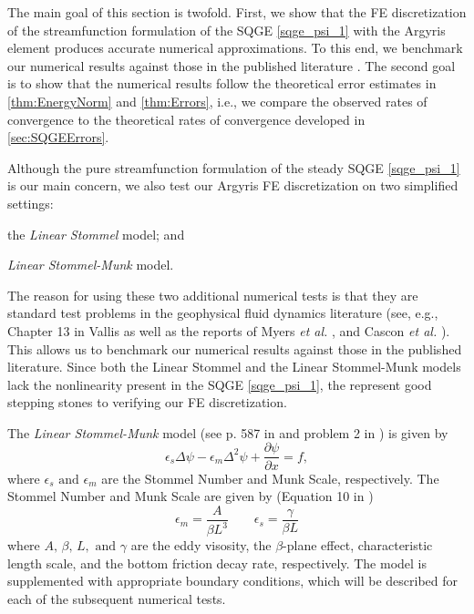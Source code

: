 The main goal of this section is twofold. First, we show that the FE discretization of the
streamfunction formulation of the SQGE \eqref{sqge_psi_1} with the Argyris element produces accurate
numerical approximations. To this end, we benchmark our numerical results against those in the
published literature \cite{Vallis06, Cascon, Myers}. The second goal is to show that the
numerical results follow the theoretical error estimates in \autoref{thm:EnergyNorm} and
\autoref{thm:Errors}, i.e., we compare the observed rates of convergence to the theoretical rates of
convergence developed in \autoref{sec:SQGEErrors}.

Although the pure streamfunction formulation of the steady SQGE \eqref{sqge_psi_1} is our main concern,
we also test our Argyris FE discretization on two simplified settings: \begin{inparaenum}[(i)] \item the
\emph{Linear Stommel} model; and \item \emph{Linear Stommel-Munk} model. \end{inparaenum} The reason
for using these two additional numerical tests is that they are standard test problems in the
geophysical fluid dynamics literature (see, e.g., Chapter 13 in Vallis \cite{Vallis06} as well as
the reports of Myers \emph{et al.} \cite{Myers}, and Cascon \emph{et al.} \cite{Cascon}). This
allows us to benchmark our numerical results against those in the published literature. Since both
the Linear Stommel and the Linear Stommel-Munk models lack the nonlinearity present in the SQGE
\eqref{sqge_psi_1}, the represent good stepping stones to verifying our FE discretization.

The \emph{Linear Stommel-Munk} model (see p. 587 in \cite{Vallis06} and problem 2 in \cite{Cascon}) is given by
\begin{equation}
  \epsilon_s \Delta \psi - \epsilon_m \Delta^2 \psi + \frac{\partial \psi}{\partial x} = f,
  \label{eqn:Stommel-Munk}
\end{equation}
where $\epsilon_s \text{ and } \epsilon_m$ are the Stommel Number and Munk Scale, respectively. The
Stommel Number and Munk Scale are given by (Equation 10 in \cite{Myers}) 
\begin{equation*}
  \epsilon_m = \frac{A}{\beta L^3} \qquad \epsilon_s = \frac{\gamma}{\beta L} 
\end{equation*}
where $A,\, \beta,\, L, \text{ and } \gamma$ are the eddy visosity, the $\beta$-plane effect,
characteristic length scale, and the bottom friction decay rate, respectively. The model is
supplemented with appropriate boundary conditions, which will be described for each of the
subsequent numerical tests.

